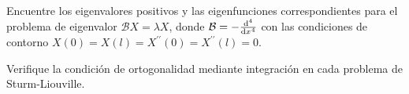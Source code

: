 \question

Encuentre los eigenvalores positivos y las eigenfunciones
correspondientes para el problema de eigenvalor
$\mathcal{B}X=\lambda X$, donde $\mathcal{B}=-\diff[4]{}{x}$
con las condiciones de contorno
\begin{math}
	X\left(0\right)=
	X\left(l\right)=
	X^{\prime\prime}\left(0\right)=
	X^{\prime\prime}\left(l\right)=
	0
\end{math}.

\question

Verifique la condición de ortogonalidad mediante integración en cada
problema de Sturm-Liouville.

\begin{multicols}{2}

\end{multicols}
